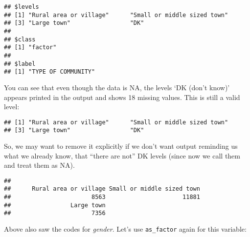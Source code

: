 \documentclass[
]{book}
\newenvironment{Shaded}{\begin{snugshade}}{\end{snugshade}}
\newcommand{\ConstantTok}[1]{\textcolor[rgb]{0.56,0.35,0.01}{#1}}
\newcommand{\FunctionTok}[1]{\textcolor[rgb]{0.13,0.29,0.53}{\textbf{#1}}}
\newcommand{\NormalTok}[1]{#1}
\newcommand{\OtherTok}[1]{\textcolor[rgb]{0.56,0.35,0.01}{#1}}
\newcommand{\SpecialCharTok}[1]{\textcolor[rgb]{0.81,0.36,0.00}{\textbf{#1}}}
\newcommand{\StringTok}[1]{\textcolor[rgb]{0.31,0.60,0.02}{#1}}
\begin{document}
\begin{verbatim}
## $levels
## [1] "Rural area or village"      "Small or middle sized town"
## [3] "Large town"                 "DK"                        
## 
## $class
## [1] "factor"
## 
## $label
## [1] "TYPE OF COMMUNITY"
\end{verbatim}

You can see that even though the data is NA, the levels `DK (don't know)' appears printed in the output and shows 18 missing values. This is still a valid level:

\begin{Shaded}
\end{Shaded}

\begin{verbatim}
## [1] "Rural area or village"      "Small or middle sized town"
## [3] "Large town"                 "DK"
\end{verbatim}

So, we may want to remove it explicitly if we don't want output reminding us what we already know, that ``there are not'' DK levels (since now we call them and treat them as NA).

\begin{Shaded}
\end{Shaded}

\begin{verbatim}
## 
##      Rural area or village Small or middle sized town 
##                       8563                      11881 
##                 Large town 
##                       7356
\end{verbatim}

Above also saw the codes for \emph{gender}. Let's use \texttt{as\_factor} again for this variable:

\begin{Shaded}
\end{Shaded}
\end{document}
